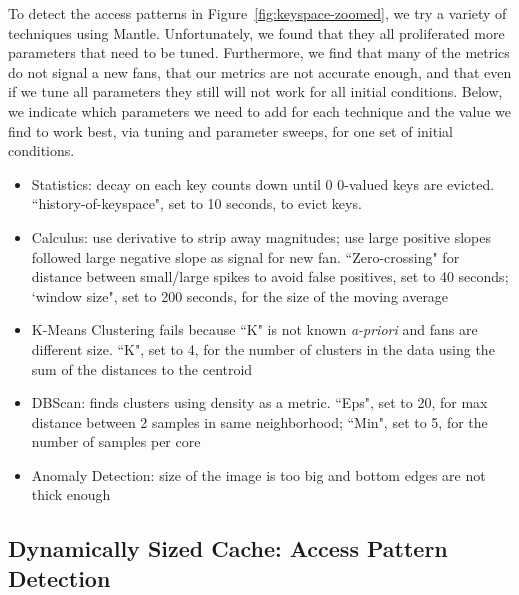 To detect the access patterns in Figure~\ref{fig:keyspace-zoomed}, we try a
variety of techniques using Mantle. Unfortunately, we found that they all
proliferated more parameters that need to be tuned. Furthermore, we find that
many of the metrics do not signal a new fans, that our metrics are not accurate
enough, and that even if we tune all parameters they still will not work for
all initial conditions.  Below, we indicate which parameters we need to add for
each technique and the value we find to work best, via tuning and parameter
sweeps, for one set of initial conditions.

\begin{itemize}

  \item Statistics: decay on each key counts down until 0 0-valued keys are
evicted.  ``history-of-keyspace", set to 10 seconds, to evict keys.

  \item Calculus: use derivative to strip away magnitudes; use large positive
slopes followed large negative slope as signal for new fan. ``Zero-crossing"
for distance between small/large spikes to avoid false positives, set to 40
seconds; `window size", set to 200 seconds, for the size of the moving average 

  \item K-Means Clustering fails because ``K" is not known {\it a-priori} and
fans are different size. ``K", set to 4, for the number of clusters in the data
using the sum of the distances to the centroid

  \item DBScan: finds clusters using density as a metric. ``Eps", set to 20, for
max distance between 2 samples in same neighborhood; ``Min", set to 5, for the
number of samples per core

  \item Anomaly Detection: size of the image is too big and bottom edges are
not thick enough

\end{itemize}

\subsection{Dynamically Sized Cache: Access Pattern Detection}
\label{sec:regime-detection}


